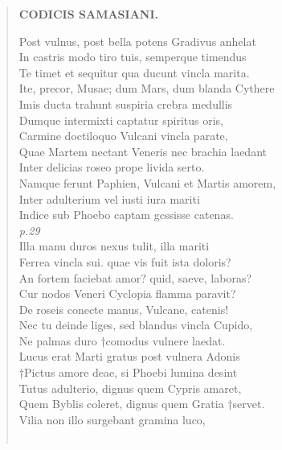 \documentclass[11pt, a4paper]{report}
\begin{document}
\begin{verse}
    \begin{center} \textbf{CODICIS SAMASIANI.} \end{center} \marginpar{[203]} Post vulnus, post bella potens Gradivus anhelat \\ In castris modo tiro tuis, semperque timendus \\ Te timet et sequitur qua ducunt vincla marita. \\ Ite, precor, Musae; dum Mars, dum blanda Cythere \\ Imis ducta trahunt suspiria crebra medullis \\ Dumque intermixti captatur spiritus oris, \\ Carmine doctiloquo Vulcani vincla parate, \\ Quae Martem nectant Veneris nec brachia laedant \\ Inter delicias roseo prope livida serto. \\ Namque ferunt Paphien, Vulcani et Martis amorem, \\ Inter adulterium vel iusti iura mariti \\ Indice sub Phoebo captam gcssisse catenas. \\ \textit{p.29} \\ Illa manu duros nexus tulit, illa mariti \\ Ferrea vincla sui. quae vis fuit ista doloris? \\ An fortem faciebat amor? quid, saeve, laboras? \\ Cur nodos Veneri Cyclopia flamma paravit? \\ De roseis conecte manus, Vulcane, catenis! \\ Nec tu deinde liges, sed blandus vincla Cupido, \\ Ne palmas duro †comodus vulnere laedat. \\ Lucus erat Marti gratus post vulnera Adonis \\ †Pictus amore deae, si Phoebi lumina desint \\ Tutus adulterio, dignus quem Cypris amaret, \\ Quem Byblis coleret, dignus quem Gratia †servet. \\ Vilia non illo surgebant gramina luco, \\ 
        ﻿\pagebreak 

\end{verse}
\end{document}
